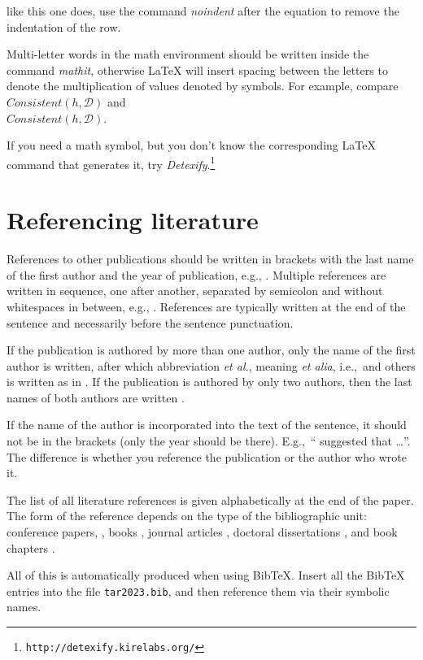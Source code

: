 \documentclass[10pt, a4paper]{article}
\begin{document}
\noindent like this one does, use the command \emph{noindent} after the equation to remove the indentation of the row.

Multi-letter words in the math environment should be written inside the command \emph{mathit}, otherwise \LaTeX{} will insert spacing between the letters to denote the multiplication of values denoted by symbols. For example, compare
$\mathit{Consistent}(h,\mathcal{D})$ and\\
$Consistent(h,\mathcal{D})$.

If you need a math symbol, but you don't know the corresponding \LaTeX{} command that generates it, try
\emph{Detexify}.\footnote{\texttt{http://detexify.kirelabs.org/}}

\section{Referencing literature}

References to other publications should be written in brackets with the last name of the first author and the year of publication, e.g., \citep{chomsky-73}.  Multiple references are written in sequence, one after another, separated by semicolon and without whitespaces in between, e.g., \citep{chomsky-73,chave-64,feigl-58}. References are typically written at the end of the sentence and necessarily before the sentence punctuation.

If the publication is authored by more than one author, only the name of the first author is written, after which abbreviation \emph{et al.}, meaning \emph{et alia}, i.e.,~and others is written as in \citep{johnson-etc}. If the publication is authored by only two authors, then the last names of both authors are written \citep{johnson-howells}.

If the name of the author is incorporated into the text of the sentence, it should not be in the brackets (only the year should be there). E.g.,~``\citet{chomsky-73}
suggested that \dots''. The difference is whether you reference the publication or the author who wrote it.

The list of all literature references is given alphabetically at the end of the paper. The form of the reference depends on the type of the bibliographic unit: conference papers,
\citep{chave-64}, books \citep{butcher-81}, journal articles
\citep{howells-51}, doctoral dissertations \citep{croft-78}, and book chapters \citep{feigl-58}.

All of this is automatically produced when using BibTeX. Insert all the BibTeX entries into the file \texttt{tar2023.bib}, and then reference them via their symbolic names.
\end{document}
